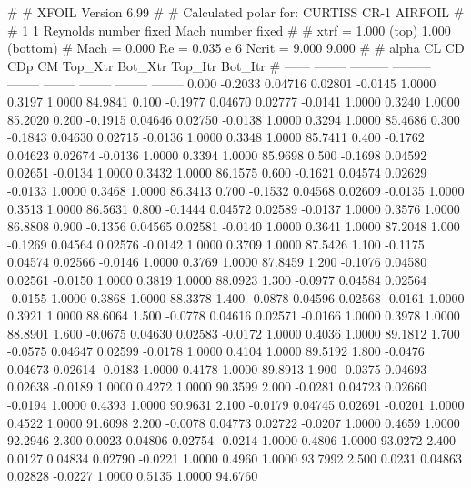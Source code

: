 #  
#       XFOIL         Version 6.99
#  
# Calculated polar for: CURTISS CR-1 AIRFOIL                            
#  
# 1 1 Reynolds number fixed          Mach number fixed         
#  
# xtrf =   1.000 (top)        1.000 (bottom)  
# Mach =   0.000     Re =     0.035 e 6     Ncrit =   9.000  9.000
#  
#   alpha    CL        CD       CDp       CM     Top_Xtr  Bot_Xtr  Top_Itr  Bot_Itr
#  ------ -------- --------- --------- -------- -------- -------- -------- --------
   0.000  -0.2033   0.04716   0.02801  -0.0145   1.0000   0.3197   1.0000  84.9841
   0.100  -0.1977   0.04670   0.02777  -0.0141   1.0000   0.3240   1.0000  85.2020
   0.200  -0.1915   0.04646   0.02750  -0.0138   1.0000   0.3294   1.0000  85.4686
   0.300  -0.1843   0.04630   0.02715  -0.0136   1.0000   0.3348   1.0000  85.7411
   0.400  -0.1762   0.04623   0.02674  -0.0136   1.0000   0.3394   1.0000  85.9698
   0.500  -0.1698   0.04592   0.02651  -0.0134   1.0000   0.3432   1.0000  86.1575
   0.600  -0.1621   0.04574   0.02629  -0.0133   1.0000   0.3468   1.0000  86.3413
   0.700  -0.1532   0.04568   0.02609  -0.0135   1.0000   0.3513   1.0000  86.5631
   0.800  -0.1444   0.04572   0.02589  -0.0137   1.0000   0.3576   1.0000  86.8808
   0.900  -0.1356   0.04565   0.02581  -0.0140   1.0000   0.3641   1.0000  87.2048
   1.000  -0.1269   0.04564   0.02576  -0.0142   1.0000   0.3709   1.0000  87.5426
   1.100  -0.1175   0.04574   0.02566  -0.0146   1.0000   0.3769   1.0000  87.8459
   1.200  -0.1076   0.04580   0.02561  -0.0150   1.0000   0.3819   1.0000  88.0923
   1.300  -0.0977   0.04584   0.02564  -0.0155   1.0000   0.3868   1.0000  88.3378
   1.400  -0.0878   0.04596   0.02568  -0.0161   1.0000   0.3921   1.0000  88.6064
   1.500  -0.0778   0.04616   0.02571  -0.0166   1.0000   0.3978   1.0000  88.8901
   1.600  -0.0675   0.04630   0.02583  -0.0172   1.0000   0.4036   1.0000  89.1812
   1.700  -0.0575   0.04647   0.02599  -0.0178   1.0000   0.4104   1.0000  89.5192
   1.800  -0.0476   0.04673   0.02614  -0.0183   1.0000   0.4178   1.0000  89.8913
   1.900  -0.0375   0.04693   0.02638  -0.0189   1.0000   0.4272   1.0000  90.3599
   2.000  -0.0281   0.04723   0.02660  -0.0194   1.0000   0.4393   1.0000  90.9631
   2.100  -0.0179   0.04745   0.02691  -0.0201   1.0000   0.4522   1.0000  91.6098
   2.200  -0.0078   0.04773   0.02722  -0.0207   1.0000   0.4659   1.0000  92.2946
   2.300   0.0023   0.04806   0.02754  -0.0214   1.0000   0.4806   1.0000  93.0272
   2.400   0.0127   0.04834   0.02790  -0.0221   1.0000   0.4960   1.0000  93.7992
   2.500   0.0231   0.04863   0.02828  -0.0227   1.0000   0.5135   1.0000  94.6760
